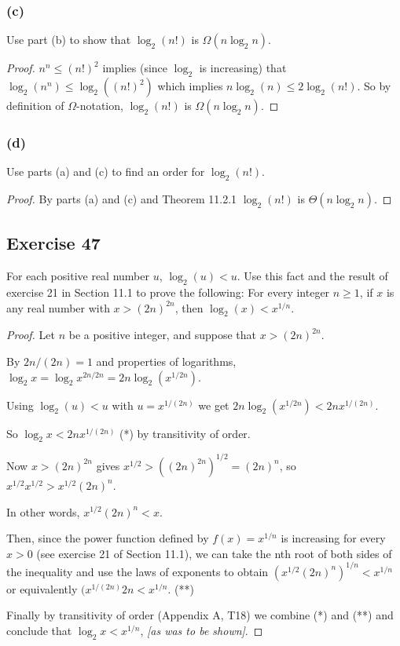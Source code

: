 \documentclass[14pt]{extarticle}
\begin{document}
\subsubsection{(c)}
Use part (b) to show that \(\log_2(n!)\) is \(\Omega(n\log_2 n)\).

\begin{proof}
\(n^n \leq (n!)^2\) implies (since \(\log_2\) is increasing) that \(\log_2(n^n) \leq \log_2((n!)^2)\) which implies
\(n\log_2(n) \leq 2\log_2(n!)\). So by definition of \(\Omega\)-notation, \(\log_2(n!)\) is \(\Omega(n\log_2 n)\).
\end{proof}

\subsubsection{(d)}
Use parts (a) and (c) to find an order for \(\log_2(n!)\).
\begin{proof}
By parts (a) and (c) and Theorem 11.2.1 \(\log_2(n!)\) is \(\Theta(n\log_2 n)\).
\end{proof}

\subsection{Exercise 47}
For each positive real number \(u\), \(\log_2(u) < u\). Use this fact and the result of exercise 21 in Section 11.1 to 
prove the following: For every integer \(n \geq 1\), if \(x\) is any real number with \(x > (2n)^{2n}\), then 
\(\log_2(x) < x^{1/n}\).

\begin{proof}
Let \(n\) be a positive integer, and suppose that \(x > (2n)^{2n}\). 

By \(2n / (2n) = 1\) and properties of logarithms, \(\log_2 x = \log_2 x^{2n/2n} = 2n \log_2 (x^{1/2n})\). 

Using \(\log_2(u) < u\) with \(u = x^{1/(2n)}\) we get \(2n \log_2 (x^{1/2n}) < 2nx^{1/(2n)}\). 

So \(\log_2 x < 2nx^{1/(2n)}\) (*) by transitivity of order.

Now \(x > (2n)^{2n}\) gives \(x^{1/2} > ((2n)^{2n})^{1/2} = (2n)^n\), so \(x^{1/2}x^{1/2} > x^{1/2}(2n)^n\).

In other words, \(x^{1/2}(2n)^n < x\).

Then, since the power function defined by \(f(x) = x^{1/n}\) is increasing for every \(x > 0\) (see exercise 21 of Section 
11.1), we can take the nth root of both sides of the inequality and use the laws of exponents to obtain 
\((x^{1/2}(2n)^n)^{1/n} < x^{1/n}\) or equivalently \((x^{1/(2n)}2n < x^{1/n}\). (**)

Finally by transitivity of order (Appendix A, T18) we combine (*) and (**) and conclude that \(\log_2 x < x^{1/n}\), 
{\it [as was to be shown]}.
\end{proof}
\end{document}
